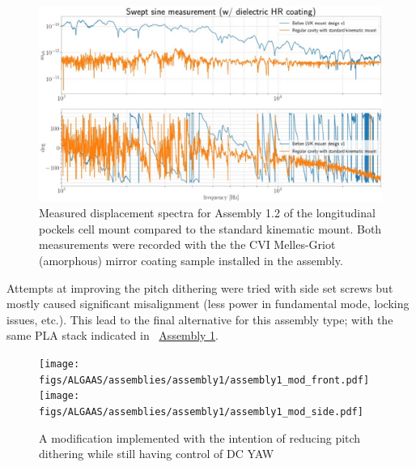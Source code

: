 
\begin{figure}[H]
\centering
\includegraphics[width=\textwidth]{figs/ALGAAS/assemblies/assembly1/assembly1_2_compare_standmount.pdf}
\caption{Measured displacement spectra for Assembly 1.2 of the longitudinal pockels cell mount compared to the standard kinematic mount. Both measurements were recorded with the the CVI Melles-Griot (amorphous) mirror coating sample installed in the assembly.}
\label{fig:A12cmpkinmnt}
\end{figure}


Attempts at improving the pitch dithering were tried with side set screws but mostly caused significant misalignment (less power in fundamental mode, locking issues, etc.). This lead to the final alternative for this assembly type; with the same PLA stack indicated in ~\hyperref[fig:A1pt0]{Assembly 1}.

\begin{figure}[!ht]
	\begin{subcaptiongroup}
		\texttt{[image: figs/ALGAAS/assemblies/assembly1/assembly1\_mod\_front.pdf]}
		\label{A1front}
		\texttt{[image: figs/ALGAAS/assemblies/assembly1/assembly1\_mod\_side.pdf]}
		\label{A1side}
	\end{subcaptiongroup}
    \caption{A modification implemented  with the intention of reducing pitch dithering while still having control of DC YAW}
    \label{fig:A1pt0mod}
\end{figure}

